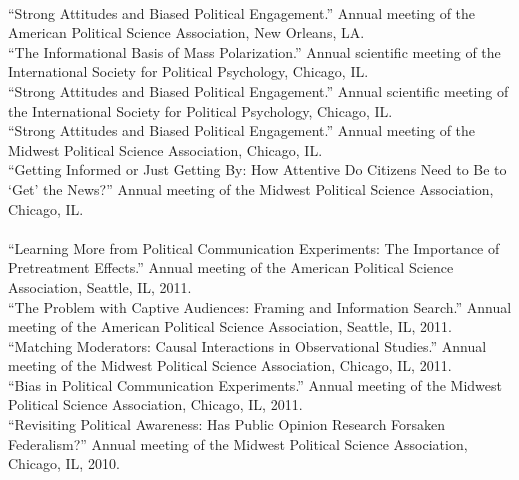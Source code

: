 \documentclass[12pt]{article}
\newcommand{\topic}[1]{\pagebreak[3]\indent {\color{lg}{\footnotesize #1 }}\\}
\newcommand{\entry}[1]{\indent {\color{lg}\guillemotright}\hspace{2pt}#1\vspace{.25em}\\}
\begin{document}
{	\topic{Conference Papers (2012)}
	\entry{``Strong Attitudes and Biased Political Engagement.'' Annual meeting of the American Political Science Association, New Orleans, LA.}
	\entry{``The Informational Basis of Mass Polarization.'' Annual scientific meeting of the International Society for Political Psychology, Chicago, IL.}
	\entry{``Strong Attitudes and Biased Political Engagement.'' Annual scientific meeting of the International Society for Political Psychology, Chicago, IL.}
	\entry{``Strong Attitudes and Biased Political Engagement.'' Annual meeting of the Midwest Political Science Association, Chicago, IL.}
	\entry{``Getting Informed or Just Getting By: How Attentive Do Citizens Need to Be to `Get' the News?'' Annual meeting of the Midwest Political Science Association, Chicago, IL.}
	
	\topic{Conference Papers (2011 and earlier)}
	\entry{``Learning More from Political Communication Experiments: The Importance of Pretreatment Effects.'' Annual meeting of the American Political Science Association, Seattle, IL, 2011.}
	\entry{``The Problem with Captive Audiences: Framing and Information Search.'' Annual meeting of the American Political Science Association, Seattle, IL, 2011.}
	\entry{``Matching Moderators: Causal Interactions in Observational Studies.'' Annual meeting of the Midwest Political Science Association, Chicago, IL, 2011.}
	\entry{``Bias in Political Communication Experiments.'' Annual meeting of the Midwest Political Science Association, Chicago, IL, 2011.}
	\entry{``Revisiting Political Awareness: Has Public Opinion Research Forsaken Federalism?'' Annual meeting of the Midwest Political Science Association, Chicago, IL, 2010.}

}
\end{document}
